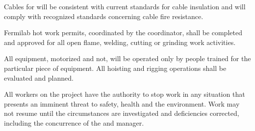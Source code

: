 Cables for  will be
consistent with current \fnal standards for cable insulation and will 
comply with recognized standards concerning cable fire resistance.

Fermilab hot work permits, coordinated by the 
 coordinator, shall be completed and approved for all open
flame, welding, cutting or grinding work activities.  

All equipment, motorized and not, will be operated only by people trained for
the particular piece of equipment. All hoisting and rigging operations shall be evaluated and planned.

All workers on the  project have the
authority to stop work in any situation that presents an imminent
threat to safety, health and the environment. Work may not resume
until the circumstances are investigated and deficiencies corrected,
including the concurrence of the  
and   manager.


